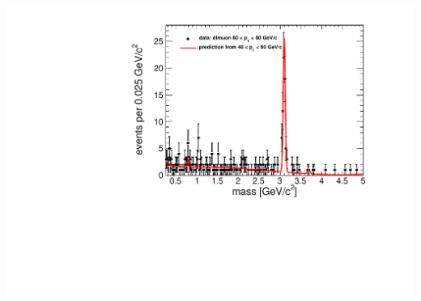 \documentclass[compress]{beamer}
\begin{document}
\begin{frame}
\begin{columns}
\includegraphics[width=\linewidth]{fullscale-control_highpt.pdf}
\end{columns}
\end{frame}
\end{document}
